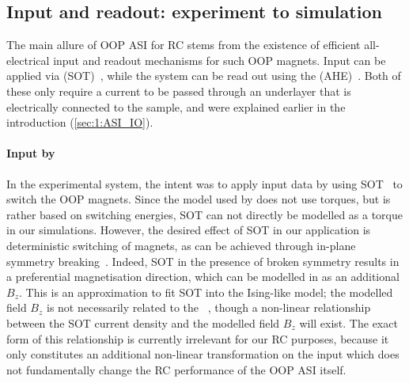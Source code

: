 \subsection{Input and readout: experiment to simulation}\label{sec:3:IO_exp_to_sim}
The main allure of OOP ASI for RC stems from the existence of efficient all-electrical input and readout mechanisms for such OOP magnets.
Input can be applied via  (SOT)~\cite{SOT_FM_AFM,SOTswitchingCoPt}, while the system can be read out using the  (AHE)~\cite{AHE}.
Both of these only require a current to be passed through an underlayer that is electrically connected to the sample, and were explained earlier in the introduction (\cref{sec:1:ASI_IO}).

\paragraph{Input by }
In the experimental system, the intent was to apply input data by using SOT~\cite{SOTswitchingCoPt} to switch the OOP magnets.
Since the model used by \hotspice does not use torques, but is rather based on switching energies, SOT can not directly be modelled as a torque in our simulations.
However, the desired effect of SOT in our application is deterministic switching of magnets, as can be achieved through in-plane symmetry breaking~\cite{SOT_Roadmap}. %
Indeed, SOT in the presence of broken symmetry results in a preferential magnetisation direction, which can be modelled in \hotspice as an additional  $B_z$.
This is an approximation to fit SOT into the Ising-like model; the modelled field $B_z$ is not necessarily related to the ~\cite{SOT_firstprinciplesCoPt}, though a non-linear relationship between the SOT current density and the modelled field $B_z$ will exist.
The exact form of this relationship is currently irrelevant for our RC purposes, because it only constitutes an additional non-linear transformation on the input which does not fundamentally change the RC performance of the OOP ASI itself.

